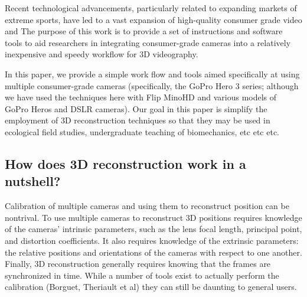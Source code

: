\documentclass[fleqn,10pt]{wlpeerj}
\begin{document}
Recent technological advancements, particularly related to expanding markets of extreme sports, have led to a vast expansion of high-quality consumer grade video and  The purpose of this work is to provide a set of instructions and software tools to aid researchers in integrating consumer-grade cameras into a relatively inexpensive and speedy workflow for 3D videography.  

In this paper, we provide a simple work flow and tools aimed specifically at  using multiple consumer-grade cameras (specifically, the GoPro Hero 3 series; although we have used the techniques here with Flip MinoHD and various models of GoPro Heros and DSLR cameras).   Our goal in this paper is simplify the employment of 3D reconstruction techniques so that they may be used in ecological field studies, undergraduate teaching of biomechanics,  etc etc etc. 

\subsection*{How does 3D reconstruction work in a nutshell?}
Calibration of multiple cameras and using them to reconstruct position can be nontrival.  To use multiple cameras to reconstruct 3D positions requires knowledge of the cameras' intrinsic parameters, such as the lens focal length, principal point, and distortion coefficients.  It also requires knowledge of the extrinsic parameters: the relative positions and orientations of the cameras with respect to one another. Finally, 3D reconstruction generally requires knowing that the frames are synchronized in time.  While a number of tools exist to actually perform the calibration (Borguet, Theriault et al) they can still be daunting to general users.
\end{document}
